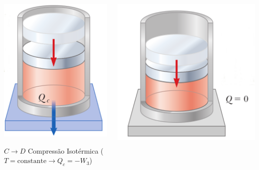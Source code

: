 \documentclass[t,%
brazilian,%
11pt,%
aspectratio=169,%
table%
]{beamer}
\begin{document}
\begin{frame}
    \begin{columns}
        \pause 
        \begin{column}{0.45\textwidth}
            \centering
            \includegraphics[height=0.45\textheight-32pt]{images/carnot-c.png}

            \(C \rightarrow D\) Compressão Isotérmica (\(T=\text{constante} \rightarrow Q_c = -W_3\))
        \end{column}

        \pause 
        \begin{column}{0.45\textwidth}
            \centering
            \includegraphics[height=0.45\textheight-32pt]{images/carnot-d.png}


\end{column}
\end{columns}
\end{frame}
\end{document}
